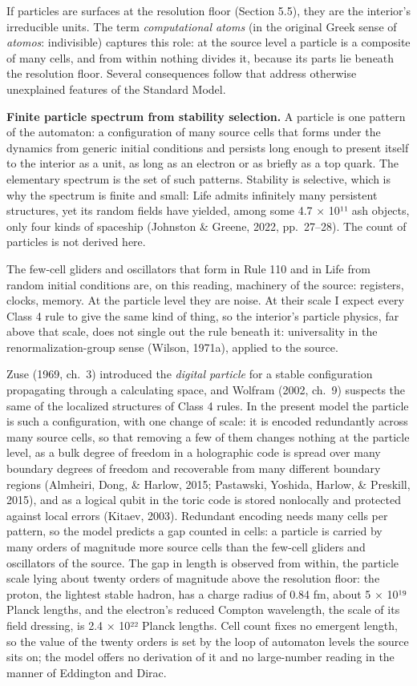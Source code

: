 \documentclass[
]{article}
\begin{document}
If particles are surfaces at the resolution floor (Section 5.5), they
are the interior's irreducible units. The term \emph{computational
atoms} (in the original Greek sense of \emph{atomos}: indivisible)
captures this role: at the source level a particle is a composite of
many cells, and from within nothing divides it, because its parts lie
beneath the resolution floor. Several consequences follow that address
otherwise unexplained features of the Standard Model.

\textbf{Finite particle spectrum from stability selection.} A particle
is one pattern of the automaton: a configuration of many source cells
that forms under the dynamics from generic initial conditions and
persists long enough to present itself to the interior as a unit, as
long as an electron or as briefly as a top quark. The elementary
spectrum is the set of such patterns. Stability is selective, which is
why the spectrum is finite and small: Life admits infinitely many
persistent structures, yet its random fields have yielded, among some
4.7 × 10¹¹ ash objects, only four kinds of spaceship (Johnston \&
Greene, 2022, pp.~27--28). The count of particles is not derived here.

The few-cell gliders and oscillators that form in Rule 110 and in Life
from random initial conditions are, on this reading, machinery of the
source: registers, clocks, memory. At the particle level they are noise.
At their scale I expect every Class 4 rule to give the same kind of
thing, so the interior's particle physics, far above that scale, does
not single out the rule beneath it: universality in the
renormalization-group sense (Wilson, 1971a), applied to the source.

Zuse (1969, ch.~3) introduced the \emph{digital particle} for a stable
configuration propagating through a calculating space, and Wolfram
(2002, ch.~9) suspects the same of the localized structures of Class 4
rules. In the present model the particle is such a configuration, with
one change of scale: it is encoded redundantly across many source cells,
so that removing a few of them changes nothing at the particle level, as
a bulk degree of freedom in a holographic code is spread over many
boundary degrees of freedom and recoverable from many different boundary
regions (Almheiri, Dong, \& Harlow, 2015; Pastawski, Yoshida, Harlow, \&
Preskill, 2015), and as a logical qubit in the toric code is stored
nonlocally and protected against local errors (Kitaev, 2003). Redundant
encoding needs many cells per pattern, so the model predicts a gap
counted in cells: a particle is carried by many orders of magnitude more
source cells than the few-cell gliders and oscillators of the source.
The gap in length is observed from within, the particle scale lying
about twenty orders of magnitude above the resolution floor: the proton,
the lightest stable hadron, has a charge radius of 0.84 fm, about 5 ×
10¹⁹ Planck lengths, and the electron's reduced Compton wavelength, the
scale of its field dressing, is 2.4 × 10²² Planck lengths. Cell count
fixes no emergent length, so the value of the twenty orders is set by
the loop of automaton levels the source sits on; the model offers no
derivation of it and no large-number reading in the manner of Eddington
and Dirac.
\end{document}

